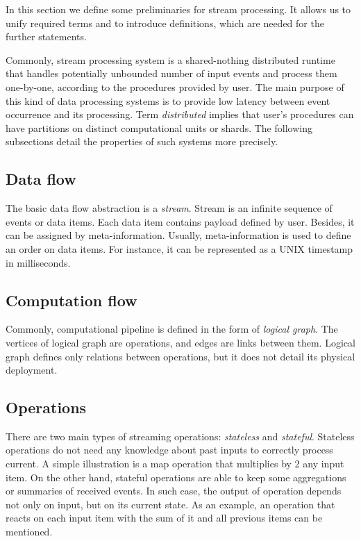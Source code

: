 
\label {fs-stream}

In this section we define some preliminaries for stream processing. It allows us to unify required terms and to introduce definitions, which are needed for the further statements.

Commonly, stream processing system is a shared-nothing distributed runtime that handles potentially unbounded number of input events and process them one-by-one, according to the procedures provided by user. The main purpose of this kind of data processing systems is to provide low latency between event occurrence and its processing. Term {\it distributed} implies that user's procedures can have partitions on distinct computational units or shards. The following subsections detail the properties of such systems more precisely.  

\subsection{Data flow}
The basic data flow abstraction is a {\it stream}. Stream is an infinite sequence of events or data items. Each data item contains payload defined by user. Besides, it can be assigned by meta-information. Usually, meta-information is used to define an order on data items. For instance, it can be represented as a UNIX timestamp in milliseconds.

\subsection{Computation flow}
Commonly, computational pipeline is defined in the form of {\it logical graph}. The vertices of logical graph are operations, and edges are links between them. Logical graph defines only relations between operations, but it does not detail its physical deployment.    

\subsection{Operations}
There are two main types of streaming operations: {\it stateless} and {\it stateful}. Stateless operations do not need any knowledge about past inputs to correctly process current. A simple illustration is a map operation that multiplies by 2 any input item. On the other hand, stateful operations are able to keep some aggregations or summaries of received events. In such case, the output of operation depends not only on input, but on its current state. As an example, an operation that reacts on each input item with the sum of it and all previous items can be mentioned. 

